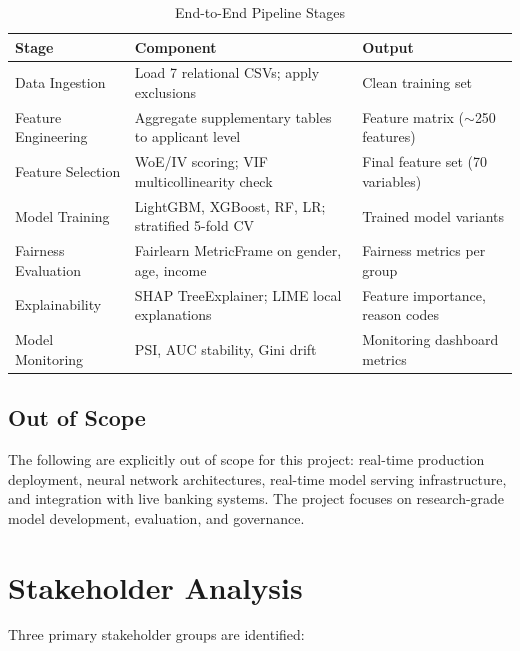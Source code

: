 \begin{table}[H]
\centering
\caption{End-to-End Pipeline Stages}
\label{tab:pipeline_stages}
\begin{tabular}{p{3.5cm}p{5cm}p{4cm}}
\toprule
\textbf{Stage} & \textbf{Component} & \textbf{Output} \\
\midrule
Data Ingestion & Load 7 relational CSVs; apply exclusions & Clean training set \\
Feature Engineering & Aggregate supplementary tables to applicant level & Feature matrix ($\sim$250 features) \\
Feature Selection & WoE/IV scoring; VIF multicollinearity check & Final feature set (70 variables) \\
Model Training & LightGBM, XGBoost, RF, LR; stratified 5-fold CV & Trained model variants \\
Fairness Evaluation & Fairlearn MetricFrame on gender, age, income & Fairness metrics per group \\
Explainability & SHAP TreeExplainer; LIME local explanations & Feature importance, reason codes \\
Model Monitoring & PSI, AUC stability, Gini drift & Monitoring dashboard metrics \\
\bottomrule
\end{tabular}
\end{table}


\FloatBarrier


\subsection{Out of Scope}

The following are explicitly out of scope for this project: real-time production deployment, neural network architectures, real-time model serving infrastructure, and integration with live banking systems. The project focuses on research-grade model development, evaluation, and governance.

\section{Stakeholder Analysis}
\label{sec:stakeholders}

Three primary stakeholder groups are identified:

